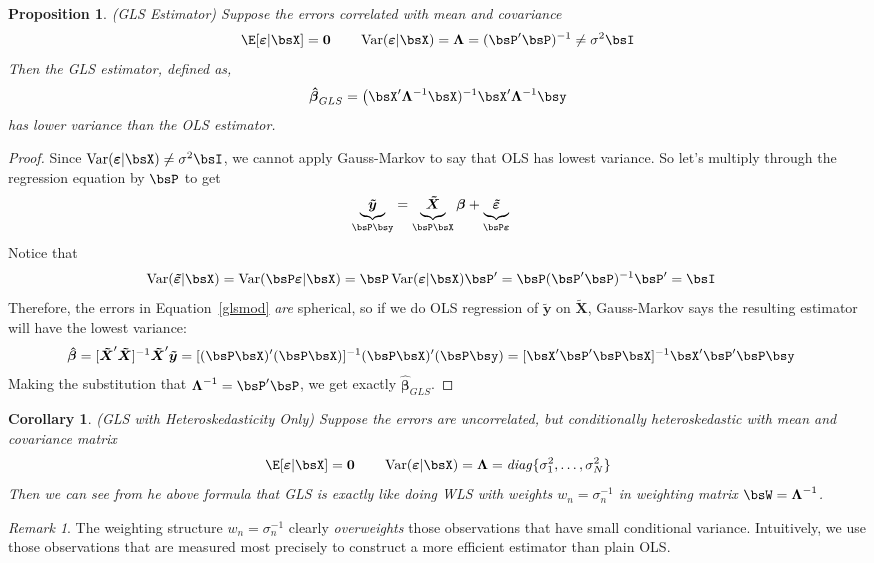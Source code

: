 \documentclass[12pt]{article}
\theoremstyle{plain}
\newtheorem{prop}[thm]{Proposition}
\newtheorem{cor}[thm]{Corollary}
\theoremstyle{definition}
\theoremstyle{remark}
\newtheorem*{rmk}{Remark}
\newcommand{\bsvarepsilon}{\boldsymbol{\varepsilon}}
\newcommand{\bsbeta}{\boldsymbol{\beta}}
\newcommand{\bsLambda}{\boldsymbol{\Lambda}}
\newcommand{\bshatbeta}{\boldsymbol{\hat{\beta}}}
\newcommand{\bstildey}{\boldsymbol{\tilde{y}}}
\newcommand{\bstildeX}{\boldsymbol{\tilde{X}}}
\newcommand{\bstildevarepsilon}{\boldsymbol{\tilde{\varepsilon}}}
\renewcommand{\bso}{\boldsymbol{0}}
\newcommand{\Var}{\operatorname{Var}}
\begin{document}
\begin{prop}\emph{(GLS Estimator)}
Suppose the errors correlated with mean and covariance
\begin{align*}
  \E[\bsvarepsilon|\bsX]= \bso
  \qquad
  \Var(\bsvarepsilon|\bsX)
  = \bsLambda
  = (\bsP'\bsP)^{-1} \neq \sigma^2\bsI
\end{align*}
Then the GLS estimator, defined as,
\begin{align*}
  \bshatbeta_{GLS} =
  \big(\bsX'\bsLambda^{-1}\bsX)^{-1}\bsX'\bsLambda^{-1}\bsy
\end{align*}
has lower variance than the OLS estimator.
\end{prop}
\begin{proof}
Since $\Var(\bsvarepsilon|\bsX)\neq\sigma^2\bsI$, we cannot apply
Gauss-Markov to say that OLS has lowest variance. So let's multiply
through the regression equation by $\bsP$ to get
\begin{align}
  \underbrace{\bstildey}_{\bsP \bsy}
  &=
  \underbrace{\bstildeX\vphantom{\bstildey}}_{\bsP \bsX}
  \bsbeta
  + \underbrace{\bstildevarepsilon\vphantom{\bstildey}}_{\bsP \bsvarepsilon}
  \label{glsmod}
\end{align}
Notice that
\begin{align*}
  \Var(\bstildevarepsilon|\bsX)
  &=
  \Var(\bsP\bsvarepsilon|\bsX)
  =
  \bsP\Var(\bsvarepsilon|\bsX)\bsP'
  =
  \bsP (\bsP'\bsP)^{-1} \bsP'
  = \bsI
\end{align*}
Therefore, the errors in Equation~\ref{glsmod} \emph{are} spherical, so
if we do OLS regression of $\bstildey$ on $\bstildeX$, Gauss-Markov says
the resulting estimator will have the lowest variance:
\begin{align*}
  \bshatbeta
  &= [\bstildeX'\bstildeX]^{-1}\bstildeX'\bstildey
  = [(\bsP\bsX)'(\bsP\bsX)]^{-1}
      (\bsP\bsX)'(\bsP\bsy)
  = [\bsX'\bsP'\bsP\bsX]^{-1}
      \bsX'\bsP'\bsP\bsy
\end{align*}
Making the substitution that $\bsLambda^{-1}=\bsP'\bsP$, we get exactly
$\bshatbeta_{GLS}$.
\end{proof}

\begin{cor}\emph{(GLS with Heteroskedasticity Only)}
Suppose the errors are uncorrelated, but conditionally heteroskedastic
with mean and covariance matrix
\begin{align*}
  \E[\bsvarepsilon|\bsX]= \bso
  \qquad
  \Var(\bsvarepsilon|\bsX)
  = \bsLambda = \text{\emph{diag}}\{\sigma_1^2,\ldots,\sigma^2_N\}
\end{align*}
Then we can see from he above formula that GLS is exactly like doing WLS
with weights $w_n=\sigma^{-1}_n$ in weighting matrix
$\bsW=\bsLambda^{-1}$.
\end{cor}
\begin{rmk}
The weighting structure $w_n=\sigma_n^{-1}$ clearly \emph{overweights}
those observations that have small conditional variance. Intuitively, we
use those observations that are measured most precisely to construct a
more efficient estimator than plain OLS.
\end{rmk}
\end{document}
